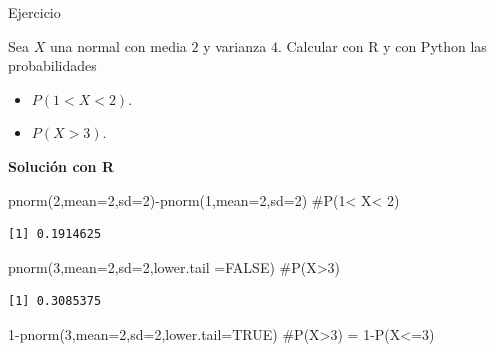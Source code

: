 \documentclass[
  letterpaper,
  DIV=11,
  numbers=noendperiod]{scrreprt}
\newenvironment{Shaded}{\begin{snugshade}}{\end{snugshade}}
\newcommand{\AttributeTok}[1]{\textcolor[rgb]{0.40,0.45,0.13}{#1}}
\newcommand{\CommentTok}[1]{\textcolor[rgb]{0.37,0.37,0.37}{#1}}
\newcommand{\ConstantTok}[1]{\textcolor[rgb]{0.56,0.35,0.01}{#1}}
\newcommand{\DecValTok}[1]{\textcolor[rgb]{0.68,0.00,0.00}{#1}}
\newcommand{\FunctionTok}[1]{\textcolor[rgb]{0.28,0.35,0.67}{#1}}
\newcommand{\NormalTok}[1]{\textcolor[rgb]{0.00,0.23,0.31}{#1}}
\newcommand{\SpecialCharTok}[1]{\textcolor[rgb]{0.37,0.37,0.37}{#1}}
\providecommand{\tightlist}{%
  \setlength{\itemsep}{0pt}\setlength{\parskip}{0pt}}\usepackage{longtable,booktabs,array}
\begin{document}
\begin{Ejercicio}{Ejercicio}{}

Sea \(X\) una normal con media \(2\) y varianza \(4\). Calcular con R y
con Python las probabilidades

\begin{itemize}
\tightlist
\item
  \(P(1< X< 2).\)
\item
  \(P(X>3).\)
\end{itemize}

\textbf{Solución con R}

\begin{Shaded}
\begin{Highlighting}[]
\FunctionTok{pnorm}\NormalTok{(}\DecValTok{2}\NormalTok{,}\AttributeTok{mean=}\DecValTok{2}\NormalTok{,}\AttributeTok{sd=}\DecValTok{2}\NormalTok{)}\SpecialCharTok{{-}}\FunctionTok{pnorm}\NormalTok{(}\DecValTok{1}\NormalTok{,}\AttributeTok{mean=}\DecValTok{2}\NormalTok{,}\AttributeTok{sd=}\DecValTok{2}\NormalTok{) }\CommentTok{\#P(1\textless{} X\textless{} 2)}
\end{Highlighting}
\end{Shaded}

\begin{verbatim}
[1] 0.1914625
\end{verbatim}

\begin{Shaded}
\begin{Highlighting}[]
\FunctionTok{pnorm}\NormalTok{(}\DecValTok{3}\NormalTok{,}\AttributeTok{mean=}\DecValTok{2}\NormalTok{,}\AttributeTok{sd=}\DecValTok{2}\NormalTok{,}\AttributeTok{lower.tail =}\ConstantTok{FALSE}\NormalTok{) }\CommentTok{\#P(X\textgreater{}3)}
\end{Highlighting}
\end{Shaded}

\begin{verbatim}
[1] 0.3085375
\end{verbatim}

\begin{Shaded}
\begin{Highlighting}[]
\DecValTok{1}\SpecialCharTok{{-}}\FunctionTok{pnorm}\NormalTok{(}\DecValTok{3}\NormalTok{,}\AttributeTok{mean=}\DecValTok{2}\NormalTok{,}\AttributeTok{sd=}\DecValTok{2}\NormalTok{,}\AttributeTok{lower.tail=}\ConstantTok{TRUE}\NormalTok{) }\CommentTok{\#P(X\textgreater{}3) = 1{-}P(X\textless{}=3)}
\end{Highlighting}
\end{Shaded}


\end{Ejercicio}
\end{document}
